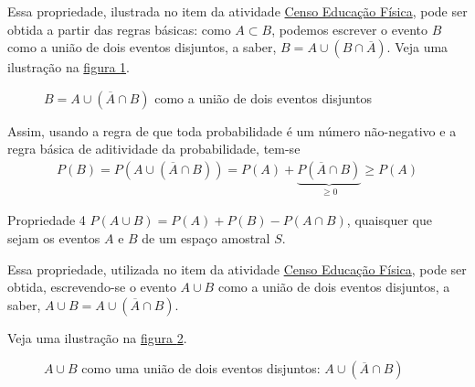Essa propriedade, ilustrada no item  da atividade \hyperref[censo-educacao-fisica]{Censo Educação Física}, pode ser obtida a partir das regras básicas:
como \(A\subset B\), podemos escrever o evento \(B\) como a união de dois eventos disjuntos, a saber,  \(B=A\cup (B\cap \overline{A})\). Veja uma ilustração na \hyperref[eventosdijuntos]{figura \ref{eventosdijuntos}}.
\begin{figure}[H]
\centering

\caption{\(B=A\cup (\overline{A}\cap B)\) como a união de dois eventos disjuntos}
\label{eventosdijuntos}
\end{figure}


Assim, usando a regra de que toda probabilidade é um número não-negativo e a regra básica de aditividade da probabilidade, tem-se
\begin{equation*}
\begin{split}P(B)=P(A\cup(\overline{A}\cap B))=P(A)+\underbrace{P(\overline{A}\cap B)}_{\geq 0}\geq P(A)\end{split}
\end{equation*}
\begin{observationtitle}{Propriedade 4}
\(P(A\cup B)=P(A)+P(B)-P(A\cap B)\), quaisquer que sejam os eventos \(A\) e \(B\) de um espaço amostral \(S\).
\end{observationtitle}

Essa propriedade, utilizada no item  da atividade \hyperref[censo-educacao-fisica]{Censo Educação Física}, pode ser obtida, escrevendo-se o evento \(A\cup B\) como a união de dois eventos disjuntos, a saber, \(A\cup B=A\cup (\overline{A}\cap B)\).

Veja uma ilustração na \hyperref[eventosdijuntos2]{figura \ref{eventosdijuntos2}}.
\begin{figure}[H]
\centering


\caption{\(A\cup B\) como uma união de dois eventos disjuntos: \(A\cup (\overline{A}\cap B)\)}
\label{eventosdijuntos2}
\end{figure}

